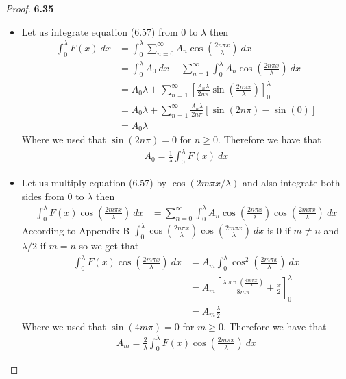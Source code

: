 \documentclass[11pt]{article}
\theoremstyle{definition}
\begin{document}
\cleardoublepage
\begin{proof}{\textbf{6.35}}
\begin{itemize}
    \item [\textbf{(a)}] Let us integrate equation (6.57) from $0$ to $\lambda$
    then
    \begin{align*}
        \int_0^\lambda F(x)~dx
        &= \int_0^\lambda
        \sum_{n=0}^\infty A_n\cos(\frac{2n\pi x}{\lambda})~dx\\
        &= \int_0^\lambda A_0~dx +
        \sum_{n=1}^\infty 
        \int_0^\lambda A_n\cos(\frac{2n\pi x}{\lambda})~dx\\
        &= A_0 \lambda +
        \sum_{n=1}^\infty 
        \left[\frac{A_n\lambda}{2n\pi}\sin(\frac{2n\pi x}{\lambda})\right]_0^\lambda\\
        &= A_0 \lambda +
        \sum_{n=1}^\infty \frac{A_n\lambda}{2n\pi} [\sin(2n\pi) - \sin(0)]\\
        &= A_0 \lambda
    \end{align*}
    Where we used that $\sin(2n\pi) = 0$ for $n \geq 0$. Therefore we have that
    \begin{align*}
        A_0 = \frac{1}{\lambda}\int_0^\lambda F(x)~dx
    \end{align*}
    \item [\textbf{(b)}] Let us multiply equation (6.57) by
    $\cos(2m\pi x/\lambda)$ and also integrate both sides from $0$ to $\lambda$
    then
    \begin{align*}
        \int_{0}^{\lambda} F(x)\cos(\frac{2m\pi x}{\lambda})~dx
        &= \sum_{n=0}^{\infty} \int_{0}^{\lambda} 
        A_n \cos(\frac{2n\pi x}{\lambda})\cos(\frac{2m\pi x}{\lambda})~dx
    \end{align*}
    According to Appendix B
    $\int_{0}^{\lambda} \cos(\frac{2n\pi x}{\lambda})\cos(\frac{2m\pi x}{\lambda})~dx$
    is 0 if $m \neq n$ and $\lambda/2$ if $m = n$ so we get that
    \begin{align*}
        \int_{0}^{\lambda} F(x)\cos(\frac{2m\pi x}{\lambda})~dx
        &= A_m\int_{0}^{\lambda}
        \cos^2\left(\frac{2m\pi x}{\lambda}\right)~dx\\
        &= A_m \left[\frac{\lambda\sin(\frac{4m\pi x}{\lambda})}{8m\pi}
        + \frac{x}{2} \right]_{0}^{\lambda}\\
        &= A_m \frac{\lambda}{2}
    \end{align*}
    Where we used that $\sin(4m\pi) = 0$ for $m \geq 0$. Therefore we have that
    \begin{align*}
        A_m = \frac{2}{\lambda}
        \int_{0}^{\lambda} F(x)\cos(\frac{2m\pi x}{\lambda})~dx
    \end{align*}
\end{itemize}
\end{proof}
\end{document}
